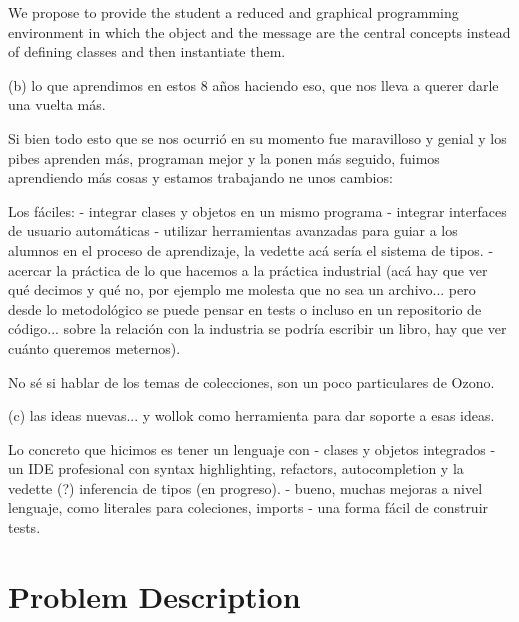 \documentclass{article}
\begin{document}

\medskip 

We propose to provide the student a reduced and graphical
programming environment in which the object and the message are
the central concepts instead of defining classes and then instantiate
them. \cite{griggio_programming_2011}



\medskip 


(b) lo que aprendimos en estos 8 años haciendo eso, que nos lleva a querer darle una vuelta más.

Si bien todo esto que se nos ocurrió en su momento fue maravilloso y genial y los pibes aprenden más, programan mejor y la ponen más seguido, fuimos aprendiendo más cosas y estamos trabajando ne unos cambios:

Los fáciles:
- integrar clases y objetos en un mismo programa
- integrar interfaces de usuario automáticas
- utilizar herramientas avanzadas para guiar a los alumnos en el proceso de aprendizaje, la vedette acá sería el sistema de tipos.
- acercar la práctica de lo que hacemos a la práctica industrial (acá hay que ver qué decimos y qué no, por ejemplo me molesta que no sea un archivo... pero desde lo metodológico se puede pensar en tests o incluso en un repositorio de código... sobre la relación con la industria se podría escribir un libro, hay que ver cuánto queremos meternos).

No sé si hablar de los temas de colecciones, son un poco particulares de Ozono.


\medskip 

(c) las ideas nuevas... y wollok como herramienta para dar soporte a esas ideas.

Lo concreto que hicimos es tener un lenguaje con
- clases y objetos integrados
- un IDE profesional con syntax highlighting, refactors, autocompletion y la vedette (?) inferencia de tipos (en progreso).
- bueno, muchas mejoras a nivel lenguaje, como literales para coleciones, imports
- una forma fácil de construir tests.

\medskip 



\section{Problem Description}
\label{sec:problem}
\end{document}

